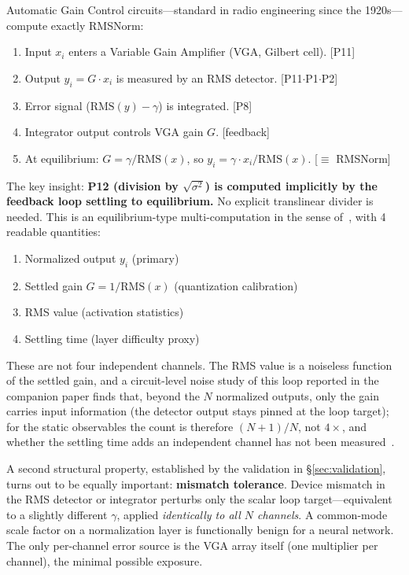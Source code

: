 \documentclass[11pt]{article}
\begin{document}
Automatic Gain Control circuits---standard in radio engineering since the 1920s---compute exactly RMSNorm:

\begin{enumerate}[leftmargin=*]
\item Input $x_i$ enters a Variable Gain Amplifier (VGA, Gilbert cell). \hfill [P11]
\item Output $y_i = G \cdot x_i$ is measured by an RMS detector. \hfill [P11$\cdot$P1$\cdot$P2]
\item Error signal ($\text{RMS}(y) - \gamma$) is integrated. \hfill [P8]
\item Integrator output controls VGA gain $G$. \hfill [feedback]
\item At equilibrium: $G = \gamma / \text{RMS}(x)$, so $y_i = \gamma \cdot x_i / \text{RMS}(x)$. \hfill [$\equiv$ RMSNorm]
\end{enumerate}

The key insight: \textbf{P12 (division by $\sqrt{\sigma^2}$) is computed implicitly by the feedback loop settling to equilibrium.} No explicit translinear divider is needed. This is an equilibrium-type multi-computation in the sense of~\cite{bieg2026}, with 4 readable quantities:
\begin{enumerate}
\item Normalized output $y_i$ (primary)
\item Settled gain $G = 1/\text{RMS}(x)$ (quantization calibration)
\item RMS value (activation statistics)
\item Settling time (layer difficulty proxy)
\end{enumerate}
These are not four independent channels. The RMS value is a noiseless function of the settled gain, and a circuit-level noise study of this loop reported in the companion paper finds that, beyond the $N$ normalized outputs, only the gain carries input information (the detector output stays pinned at the loop target); for the static observables the count is therefore $(N+1)/N$, not $4\times$, and whether the settling time adds an independent channel has not been measured~\cite{bieg2026}.

A second structural property, established by the validation in \S\ref{sec:validation}, turns out to be equally important: \textbf{mismatch tolerance}. Device mismatch in the RMS detector or integrator perturbs only the scalar loop target---equivalent to a slightly different $\gamma$, applied \textit{identically to all $N$ channels}. A common-mode scale factor on a normalization layer is functionally benign for a neural network. The only per-channel error source is the VGA array itself (one multiplier per channel), the minimal possible exposure.
\end{document}
